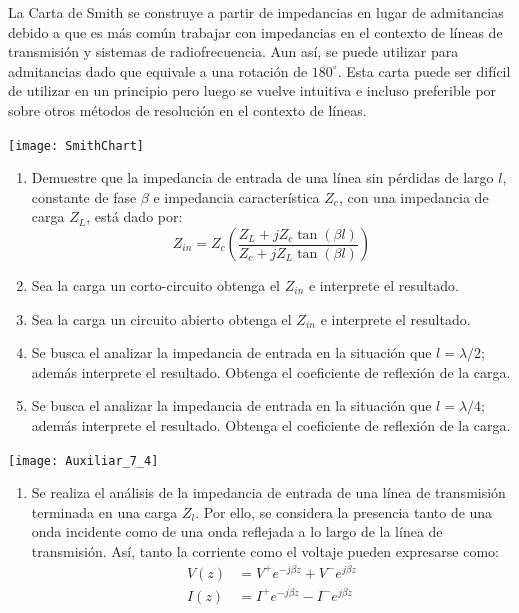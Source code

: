 \documentclass[
  11pt,
  letterpaper,
   addpoints,
   answers
  ]{exam}
\begin{document}
La Carta de Smith se construye a partir de impedancias en lugar de admitancias debido a que es más común trabajar con impedancias en el contexto de líneas de transmisión y sistemas de radiofrecuencia. Aun así, se puede utilizar para admitancias dado que equivale a una rotación de $180^\circ$. Esta carta puede ser difícil de utilizar en un principio pero luego se vuelve intuitiva e incluso preferible por sobre otros métodos de resolución en el contexto de líneas.
\begin{center}
    \texttt{[image: SmithChart]}
\end{center}

\vspace{0.5cm}
\noindent
\vspace{.85cm}
\begin{questions}
    \question
    \begin{enumerate}
    \item Demuestre que la impedancia de entrada de una línea sin pérdidas de largo $l$, constante de fase $\beta$ e impedancia característica $Z_c$, con una impedancia de carga $Z_L$, está dado por:
    \[
    Z_{in} = Z_c \left( \frac{Z_L + j Z_c \tan(\beta l)}{Z_c + j Z_L \tan(\beta l)} \right)
    \]
    
    \item Sea la carga un corto-circuito obtenga el $Z_{in}$ e interprete el resultado.
    
    \item Sea la carga un circuito abierto obtenga el $Z_{in}$ e interprete el resultado.
    
    \item Se busca el analizar la impedancia de entrada en la situación que $l = \lambda/2$; además interprete el resultado. Obtenga el coeficiente de reflexión de la carga.
    
    \item Se busca el analizar la impedancia de entrada en la situación que $l = \lambda/4$; además interprete el resultado. Obtenga el coeficiente de reflexión de la carga.
\end{enumerate}
  \begin{center}
        \texttt{[image: Auxiliar\_7\_4]}
      \end{center}
    \begin{solution}
        \begin{enumerate}
            \item Se realiza el análisis de la impedancia de entrada de una línea de transmisión terminada en una carga $Z_{l}$. Por ello, se considera la presencia tanto de una onda incidente como de una onda reflejada a lo largo de la línea de transmisión. Así, tanto la corriente como el voltaje pueden expresarse como:
\begin{align}
    V(z) &= V^{+}e^{-j\beta z} + V^{-}e^{j\beta z} \\
    I(z) &= I^{+}e^{-j\beta z} - I^{-}e^{j\beta z}
\end{align}


\end{enumerate}
\end{solution}
\end{questions}
\end{document}
